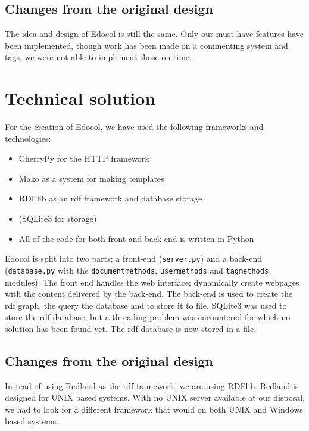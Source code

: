 \documentclass[12pt,a4paper]{article}
\begin{document}
  
    \subsection{Changes from the original design} 
      The idea and design of Edocol is still the same. Only our must-have features
      have been implemented, though work has been made on a commenting system and tags,
      we were not able to implement those on time.
  
  \section{Technical solution}
    For the creation of Edocol, we have used the following frameworks and technologies:
    \begin{itemize}
      \item CherryPy\cite{cherrypy} for the HTTP framework
      \item Mako\cite{mako} as a system for making templates
      \item RDFlib\cite{rdflib} as an rdf framework and database storage
      \item (SQLite3 for storage)
      \item All of the code for both front and back end is written in Python
    \end{itemize}
    
    Edocol is split into two parts; a front-end (\verb|server.py|) and a 
    back-end (\verb|database.py| with the \verb|documentmethods|, 
    \verb|usermethods| and \verb|tagmethods| modules). The front end 
    handles the web interface; dynamically create webpages with the content 
    delivered by the back-end. The back-end is used to create the rdf graph, 
    the query the database and to store it to file. SQLite3 was used to store the
    rdf database, but a threading problem was encountered for which no solution
    has been found yet. The rdf database is now stored in a file. 
    
    \subsection{Changes from the original design}
    Instead of using Redland\cite{redland} as the rdf framework, we are using RDFlib. Redland is
    designed for UNIX based systems. With no UNIX server available at our disposal,
    we had to look for a different framework that would on both UNIX and Windows
    based systems.  
  
\end{document}
